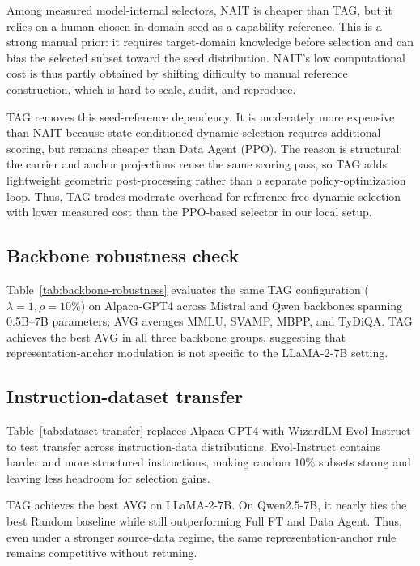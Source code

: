 Among measured model-internal selectors, NAIT is cheaper than
\textsc{TAG}, but it relies on a human-chosen in-domain seed as a
capability reference. This is a strong manual prior: it requires
target-domain knowledge before selection and can bias the selected
subset toward the seed distribution. NAIT's low computational cost
is thus partly obtained by shifting difficulty to manual reference
construction, which is hard to scale, audit, and reproduce.

\textsc{TAG} removes this seed-reference dependency. It is moderately
more expensive than NAIT because state-conditioned dynamic selection
requires additional scoring, but remains cheaper than Data Agent (PPO).
The reason is structural: the carrier and anchor projections reuse
the same scoring pass, so \textsc{TAG} adds lightweight geometric
post-processing rather than a separate policy-optimization loop. Thus,
\textsc{TAG} trades moderate overhead for reference-free dynamic
selection with lower measured cost than the PPO-based selector in our
local setup.


\subsection{Backbone robustness check}
\label{sec:qwen-scale}

Table~\ref{tab:backbone-robustness} evaluates the same \textsc{TAG}
configuration (\(\lambda{=}1,\rho{=}10\%\)) on Alpaca-GPT4 across
Mistral and Qwen backbones spanning 0.5B--7B parameters; AVG averages
MMLU, SVAMP, MBPP, and TyDiQA. \textsc{TAG} achieves the best AVG in
all three backbone groups, suggesting that representation-anchor
modulation is not specific to the LLaMA-2-7B setting.


\subsection{Instruction-dataset transfer}
\label{sec:dataset-transfer}

Table~\ref{tab:dataset-transfer} replaces Alpaca-GPT4 with
WizardLM Evol-Instruct to test transfer across instruction-data
distributions. Evol-Instruct contains harder and more structured
instructions, making random \(10\%\) subsets strong and leaving
less headroom for selection gains.

\textsc{TAG} achieves the best AVG on LLaMA-2-7B. On Qwen2.5-7B,
it nearly ties the best Random baseline while still outperforming
Full FT and Data Agent. Thus, even under a stronger source-data
regime, the same representation-anchor rule remains competitive
without retuning.


